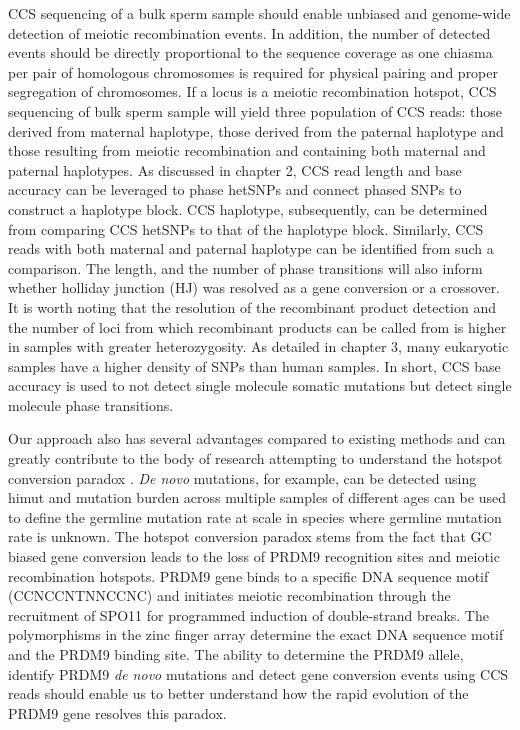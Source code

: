 CCS sequencing of a bulk sperm sample should enable unbiased and genome-wide detection of meiotic recombination events. In addition, the number of detected events should be directly proportional to the sequence coverage as one chiasma per pair of homologous chromosomes is required for physical pairing and proper segregation of chromosomes. If a locus is a meiotic recombination hotspot, CCS sequencing of bulk sperm sample will yield three population of CCS reads: those derived from maternal haplotype, those derived from the paternal haplotype and those resulting from meiotic recombination and containing both maternal and paternal haplotypes. As discussed in chapter 2, CCS read length and base accuracy can be leveraged to phase hetSNPs and connect phased SNPs to construct a haplotype block. CCS haplotype, subsequently, can be determined from comparing CCS hetSNPs to that of the haplotype block. Similarly, CCS reads with both maternal and paternal haplotype can be identified from such a comparison. The length, and the number of phase transitions will also inform whether holliday junction (HJ) was resolved as a gene conversion or a crossover. It is worth noting that the resolution of the recombinant product detection and the number of loci from which recombinant products can be called from is higher in samples with greater heterozygosity. As detailed in chapter 3, many eukaryotic samples have a higher density of SNPs than human samples. In short, CCS base accuracy is used to not detect single molecule somatic mutations but detect single molecule phase transitions.

Our approach also has several advantages compared to existing methods and can greatly contribute to the body of research attempting to understand the hotspot conversion paradox \cite{}. \textit{De novo} mutations, for example, can be detected using himut and mutation burden across multiple samples of different ages can be used to define the germline mutation rate at scale in species where germline mutation rate is unknown. The hotspot conversion paradox stems from the fact that GC biased gene conversion leads to the loss of PRDM9 recognition sites and meiotic recombination hotspots. PRDM9 gene binds to a specific DNA sequence motif (CCNCCNTNNCCNC) \cite{} and initiates meiotic recombination through the recruitment of SPO11 for programmed induction of double-strand breaks. The polymorphisms in the zinc finger array determine the exact DNA sequence motif and the PRDM9 binding site. The ability to determine the PRDM9 allele, identify PRDM9 \textit{de novo} mutations and detect gene conversion events using CCS reads should enable us to better understand how the rapid evolution of the PRDM9 gene resolves this paradox. 

